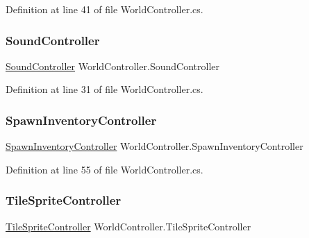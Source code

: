 Definition at line 41 of file World\+Controller.\+cs.

\mbox{\label{class_world_controller_aefca92e9db3022e5a5aa7c624f19b931}} 
\subsubsection{\texorpdfstring{Sound\+Controller}{SoundController}}
{\footnotesize\ttfamily \hyperlink{class_sound_controller}{Sound\+Controller} World\+Controller.\+Sound\+Controller\hspace{0.3cm}{\ttfamily [get]}}



Definition at line 31 of file World\+Controller.\+cs.

\mbox{\label{class_world_controller_a06f2556c0b263655566adb7b58bbd061}} 
\subsubsection{\texorpdfstring{Spawn\+Inventory\+Controller}{SpawnInventoryController}}
{\footnotesize\ttfamily \hyperlink{class_spawn_inventory_controller}{Spawn\+Inventory\+Controller} World\+Controller.\+Spawn\+Inventory\+Controller\hspace{0.3cm}{\ttfamily [get]}}



Definition at line 55 of file World\+Controller.\+cs.

\mbox{\label{class_world_controller_aec5ca660778fb0c9b13154804e63a9a5}} 
\subsubsection{\texorpdfstring{Tile\+Sprite\+Controller}{TileSpriteController}}
{\footnotesize\ttfamily \hyperlink{class_tile_sprite_controller}{Tile\+Sprite\+Controller} World\+Controller.\+Tile\+Sprite\+Controller\hspace{0.3cm}{\ttfamily [get]}}



